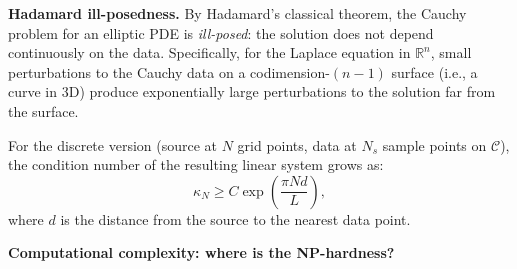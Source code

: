 \documentclass[aps,prd,twocolumn,superscriptaddress,nofootinbib]{revtex4-2}
\begin{document}
\textbf{Hadamard ill-posedness.}
By Hadamard's classical theorem, the Cauchy problem for an elliptic PDE
is \emph{ill-posed}: the solution does not depend continuously on the
data.  Specifically, for the Laplace equation in $\mathbb{R}^n$, small
perturbations to the Cauchy data on a codimension-$(n-1)$ surface (i.e.,
a curve in 3D) produce exponentially large perturbations to the solution
far from the surface.

For the discrete version (source at $N$ grid points, data at $N_s$ sample
points on $\mathcal{C}$), the condition number of the resulting linear
system grows as:
\begin{equation}
\kappa_N \geq C\exp\!\left(\frac{\pi N d}{L}\right),
\label{eq:kappa}
\end{equation}
where $d$ is the distance from the source to the nearest data point.

\textbf{Computational complexity: where is the NP-hardness?}
\end{document}
